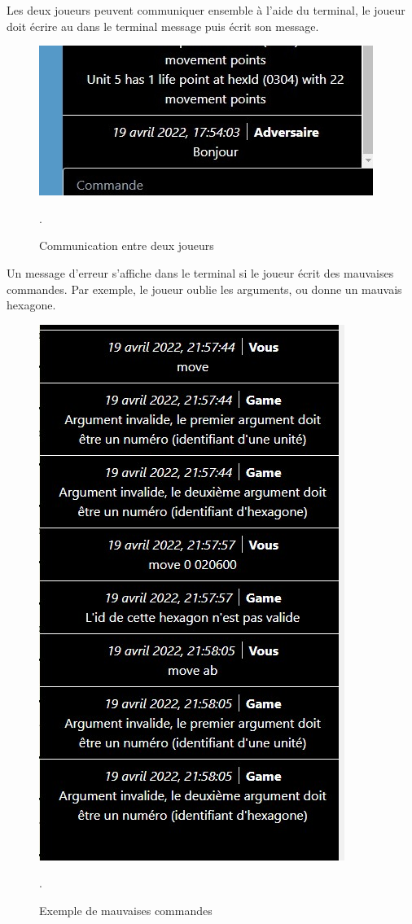 Les deux joueurs peuvent communiquer ensemble  à l'aide du terminal, le joueur doit écrire au dans le terminal \og message \fg{} puis écrit son message.\\
\begin{figure}[H]
    \centering
    \includegraphics[scale=0.6]{data/chat.jpg}
    \caption{Communication entre deux joueurs}.
\end{figure}

Un message d'erreur s'affiche dans le terminal si le joueur écrit  des mauvaises commandes.
Par exemple, le joueur oublie les arguments, ou donne un mauvais hexagone.\\

\begin{figure}[H]
    \centering
    \includegraphics[scale=0.6]{data/erreur.jpg}
    \caption{Exemple de mauvaises commandes}.
\end{figure}

